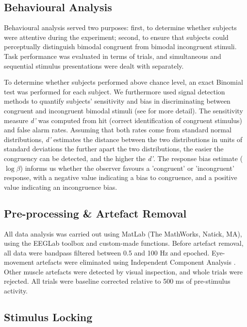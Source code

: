 \subsection{Behavioural Analysis}

Behavioural analysis served two purposes: first, to determine whether
subjects were attentive during the experiment; second, to ensure that
subjects could perceptually distinguish bimodal congruent from bimodal
incongruent stimuli. Task performance was evaluated in terms of trials, and
simultaneous and sequential stimulus presentations were dealt with
separately.



To determine whether subjects performed above chance level, an exact
Binomial test was performed for each subject. We furthermore used signal
detection methods to quantify subjects' sensitivity and bias in
discriminating between congruent and incongruent bimodal stimuli (see
\cite{Wickens2002a} for more detail). The sensitivity measure \textit{d'}
was computed from hit (correct identification of congruent stimulus) and
false alarm rates.  Assuming that both rates come from standard normal
distributions, \textit{d'} estimates the distance between the two
distributions in units of standard deviations \textemdash the further apart
the two distributions, the easier the congruency can be detected, and the
higher the \textit{d'}. The response bias estimate ($\log{\beta}$) informs
us whether the observer favours a 'congruent' or 'incongruent' response,
with a negative value indicating a bias to congruence, and a positive value
indicating an incongruence bias.

\subsection{Pre-processing \& Artefact Removal}

All data analysis was carried out using MatLab (The MathWorks, Natick, MA),
using the EEGLab toolbox \citep{delorme2004a} and custom-made functions.
Before artefact removal, all data were bandpass filtered between 0.5 and
100 Hz and epoched. Eye-movement artefacts were eliminated using
Independent Component Analysis \citep{Jung2000a}. Other muscle artefacts
were detected by visual inspection, and whole trials were rejected. All
trials were baseline corrected relative to 500 ms of pre-stimulus activity.

\subsection{Stimulus Locking}

